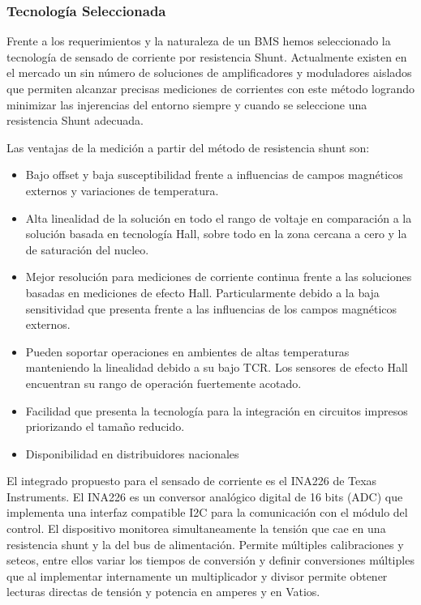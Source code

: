 \documentclass[10pt,a4paper]{article}
\begin{document}
\subsubsection{Tecnología Seleccionada}

Frente a los requerimientos y la naturaleza de un \acrshort{BMS} hemos
seleccionado la tecnología de sensado de corriente por resistencia Shunt.
Actualmente existen en el mercado un sin número de soluciones de amplificadores
y moduladores aislados que permiten alcanzar precisas mediciones de corrientes
con este método logrando minimizar las injerencias del entorno siempre y cuando
se seleccione una resistencia Shunt adecuada.

\noindent Las ventajas de la medición a partir del método de resistencia 
shunt son:

\begin{itemize}
    \item Bajo offset y baja susceptibilidad frente a influencias de campos 
	magnéticos externos y variaciones de temperatura.
    \item Alta linealidad de la solución en todo el rango de voltaje en 
	comparación a la solución basada en tecnología Hall, sobre todo en 
	la zona cercana a cero y la de saturación del nucleo. 
    \item Mejor resolución para mediciones de corriente continua frente a 
	las soluciones basadas en mediciones de efecto Hall. 
	Particularmente debido a la baja sensitividad que presenta frente a 
	las influencias de los campos magnéticos externos.
    \item Pueden soportar operaciones en ambientes de altas temperaturas 
	manteniendo la linealidad debido a su bajo TCR. 
	Los sensores de efecto Hall encuentran su rango de operación 
	fuertemente acotado.
    \item Facilidad que presenta la tecnología para la integración en 
	circuitos impresos priorizando el tamaño reducido.
    \item Disponibilidad en distribuidores nacionales
\end{itemize}

\noindent El integrado propuesto para el sensado de corriente es el INA226 de
Texas Instruments. El INA226 es un conversor analógico digital de 16 bits (ADC)
que implementa una interfaz compatible I2C para la comunicación con el módulo
del control. El dispositivo monitorea simultaneamente la tensión que cae en una
resistencia shunt y la del bus de alimentación. Permite múltiples calibraciones
y seteos, entre ellos variar los tiempos de conversión y definir conversiones
múltiples que al implementar internamente un multiplicador y divisor permite
obtener lecturas directas de tensión y potencia en amperes y en Vatios.
\end{document}
